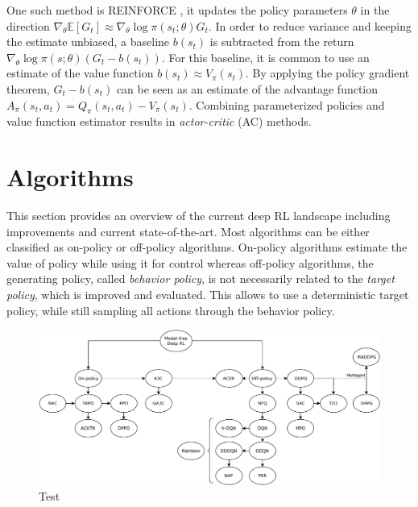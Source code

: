     One such method is REINFORCE \cite{Williams1992}, it updates the policy parameters $\theta$ in the direction $\nabla_\theta \mathbb{E}[G_t]\approx \nabla_\theta\log\pi(s_t;\theta)G_t$.
    In order to reduce variance and keeping the estimate unbiased, a baseline $b(s_t)$ is subtracted from the return $\nabla_\theta\log\pi(s;\theta)(G_t - b(s_t))$. 
    For this baseline, it is common to use an estimate of the value function $b(s_t)\approx V_\pi(s_t)$.
    By applying the policy gradient theorem, $G_t-b(s_t)$ can be seen as an estimate of the advantage function $A_\pi(s_t,a_t) = Q_\pi(s_t,a_t) - V_\pi(s_t)$.
    Combining parameterized policies and value function estimator results in \textit{actor-critic} (AC) methods. 
    


    \section{Algorithms \label{sec:algo}}
	This section provides an overview of the current deep RL landscape including improvements and current state-of-the-art. 
	Most algorithms can be either classified as on-policy or off-policy algorithms.
	On-policy algorithms estimate the value of policy while using it for control whereas off-policy algorithms, the generating policy, called \textit{behavior policy}, is not necessarily related to the \textit{target policy}, which is improved and evaluated.
	This allows to use a deterministic target policy, while still sampling all actions through the behavior policy. \cite[chapter 5]{Sutton2018}
	\begin{figure}[!htbp]
		\centering
		\includegraphics[angle=90, height=\textheight]{images/tree.pdf}
		\caption{Test}
	\end{figure}
		
